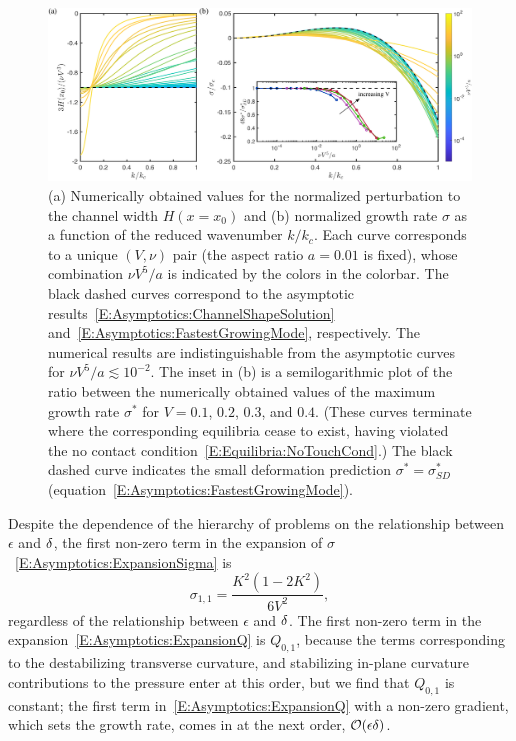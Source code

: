 \documentclass{jfm}
\begin{document}
\begin{figure}
\centering
\includegraphics[width = \textwidth]{figures/asymptotics.pdf}
\caption{(a) Numerically obtained values for the normalized perturbation to the channel width $H(x = x_0)$ and (b) normalized growth rate $\sigma$ as a function of the reduced wavenumber $k/k_c$. Each curve corresponds to a unique $(V,\nu)$ pair (the aspect ratio $a = 0.01$ is fixed), whose combination $\nu V^5 /a$ is indicated by the colors in the colorbar. The black dashed curves correspond to the asymptotic results~\eqref{E:Asymptotics:ChannelShapeSolution} and~\eqref{E:Asymptotics:FastestGrowingMode}, respectively. The numerical results are indistinguishable from the asymptotic curves for $\nu V^5 /a \lesssim 10^{-2}$. The inset in (b) is a semilogarithmic plot of the ratio between the numerically obtained values of the maximum growth rate $\sigma^*$ for $V = 0.1$, $0.2$, $0.3$, and $0.4$. (These curves terminate where the corresponding equilibria cease to exist, having violated the no contact condition~\eqref{E:Equilibria:NoTouchCond}.) The black dashed curve indicates the small deformation prediction $\sigma^* = \sigma^*_{SD}$ (equation~\eqref{E:Asymptotics:FastestGrowingMode}).}
\label{fig:CollapsedGrowthRates}
\end{figure}

Despite the dependence of the hierarchy of problems on the relationship between $\epsilon$ and $\delta$, the first non-zero term in the expansion of $\sigma$~\eqref{E:Asymptotics:ExpansionSigma} is
\begin{equation}\label{E:Asymptotics:LeadingOrderSigma}
\sigma_{1,1} = \frac{K^2\left(1-2K^2\right)}{6V^2},
\end{equation}
regardless of the relationship between $\epsilon$ and $\delta$. The first non-zero term in the expansion~\eqref{E:Asymptotics:ExpansionQ} is $Q_{0,1}$, because the terms corresponding to the destabilizing transverse curvature, and stabilizing in-plane curvature contributions to the pressure enter at this order, but we find that $Q_{0,1}$ is constant; the first term in~\eqref{E:Asymptotics:ExpansionQ} with a non-zero gradient, which sets the growth rate, comes in at the next order, $\mathcal{O}(\epsilon \delta)$.
\end{document}
